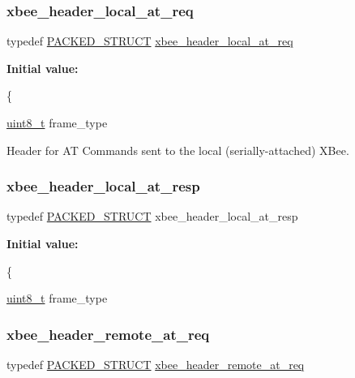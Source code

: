 \subsubsection{\texorpdfstring{xbee\+\_\+header\+\_\+local\+\_\+at\+\_\+req}{xbee\_header\_local\_at\_req}}
{\footnotesize\ttfamily typedef \hyperlink{group___s_x_a_ga4233297bd31be5c273d4fb0758cc54d7}{P\+A\+C\+K\+E\+D\+\_\+\+S\+T\+R\+U\+CT} \hyperlink{group__xbee__atcmd_ga9bf03869fc9022aadb223bfe0cbbce48}{xbee\+\_\+header\+\_\+local\+\_\+at\+\_\+req}}

{\bfseries Initial value\+:}
\begin{DoxyCode}
\{
   
   \hyperlink{group__hal__dos_gae1affc9ca37cfb624959c866a73f83c2}{uint8\_t}          frame\_type
\end{DoxyCode}


Header for AT Commands sent to the local (serially-\/attached) X\+Bee. 

\mbox{\label{group__xbee__atcmd_ga99f105c39f52045b88bc1974fb520ed2}} 
\subsubsection{\texorpdfstring{xbee\+\_\+header\+\_\+local\+\_\+at\+\_\+resp}{xbee\_header\_local\_at\_resp}}
{\footnotesize\ttfamily typedef \hyperlink{group___s_x_a_ga4233297bd31be5c273d4fb0758cc54d7}{P\+A\+C\+K\+E\+D\+\_\+\+S\+T\+R\+U\+CT} xbee\+\_\+header\+\_\+local\+\_\+at\+\_\+resp}

{\bfseries Initial value\+:}
\begin{DoxyCode}
\{
   
   \hyperlink{group__hal__dos_gae1affc9ca37cfb624959c866a73f83c2}{uint8\_t}          frame\_type
\end{DoxyCode}
\mbox{\label{group__xbee__atcmd_gad9afb37256d642019ad00c6ec75eae05}} 
\subsubsection{\texorpdfstring{xbee\+\_\+header\+\_\+remote\+\_\+at\+\_\+req}{xbee\_header\_remote\_at\_req}}
{\footnotesize\ttfamily typedef \hyperlink{group___s_x_a_ga4233297bd31be5c273d4fb0758cc54d7}{P\+A\+C\+K\+E\+D\+\_\+\+S\+T\+R\+U\+CT} \hyperlink{group__xbee__atcmd_gad9afb37256d642019ad00c6ec75eae05}{xbee\+\_\+header\+\_\+remote\+\_\+at\+\_\+req}}

